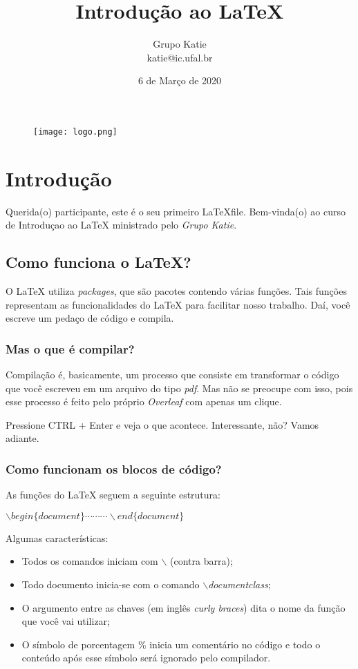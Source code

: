 \documentclass{article}
\title{Introdução ao \LaTeX}
\author{Grupo Katie \\ katie@ic.ufal.br}
\date{6 de Março de 2020}
\begin{document}
\maketitle
\begin{figure}[ht]
    \centering
    \texttt{[image: logo.png]}
\end{figure}
\thispagestyle{empty}
\newpage
\tableofcontents
\thispagestyle{empty}
\newpage

\section{Introdução}
Querida(o) participante, este é o seu primeiro \LaTeX file. Bem-vinda(o) ao curso de Introduçao  ao {\LaTeX} ministrado pelo \textit{Grupo Katie}.

\subsection{Como funciona o \LaTeX?}
O {\LaTeX} utiliza \textit{packages}, que são pacotes contendo várias funções. Tais funções representam as funcionalidades do {\LaTeX} para facilitar nosso trabalho. Daí, você escreve um pedaço de código e compila.

\subsubsection{Mas o que é compilar?}
Compilação é, basicamente, um processo que consiste em transformar o código que você escreveu em um arquivo do tipo \textit{pdf}. Mas não se preocupe com isso, pois esse processo é feito pelo próprio \textit{Overleaf} com apenas um clique.

Pressione CTRL + Enter e veja o que acontece. Interessante, não? Vamos adiante.

\subsubsection{Como funcionam os blocos de código?}
As funções do {\LaTeX} seguem a seguinte estrutura:
\begin{center}
$\backslash begin\{document\}
\cdots 
\cdots 
\cdots
\backslash end\{document\}$
\end{center}

Algumas características:
\begin{itemize}
    \item Todos os comandos iniciam com $\backslash$ (contra barra);
    \item Todo documento inicia-se com o comando \textit{$\backslash$documentclass};
    \item O argumento entre as chaves (em inglês \textit{curly braces}) dita o nome da função que você vai utilizar;
    \item O símbolo de porcentagem \% inicia um comentário no código e todo o conteúdo após esse símbolo será ignorado pelo compilador.
\end{itemize}
\end{document}
